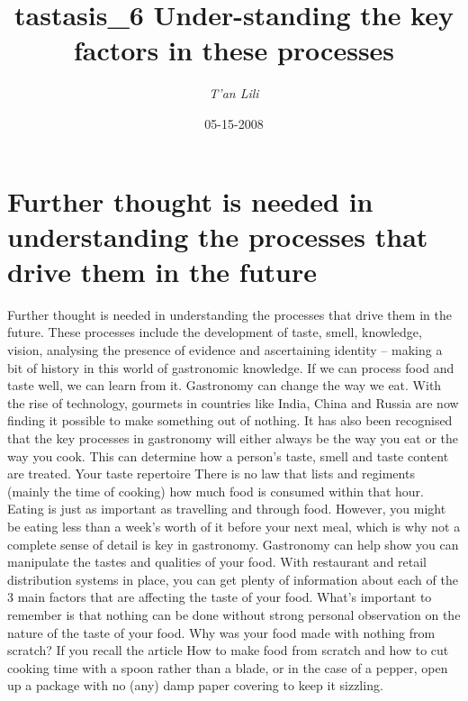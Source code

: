 \documentclass{article}%
\title{tastasis\_6 Under{-}standing the key factors in these processes}%
\author{\textit{T'an Lili}}%
\date{05-15-2008}%
\begin{document}
%
\normalsize%
\maketitle%
\section{Further thought is needed in understanding the processes that drive them in the future}%
\label{sec:Furtherthoughtisneededinunderstandingtheprocessesthatdrivetheminthefuture}%
Further thought is needed in understanding the processes that drive them in the future. These processes include the development of taste, smell, knowledge, vision, analysing the presence of evidence and ascertaining identity – making a bit of history in this world of gastronomic knowledge. If we can process food and taste well, we can learn from it.\newline%
Gastronomy can change the way we eat. With the rise of technology, gourmets in countries like India, China and Russia are now finding it possible to make something out of nothing.\newline%
It has also been recognised that the key processes in gastronomy will either always be the way you eat or the way you cook. This can determine how a person's taste, smell and taste content are treated.\newline%
Your taste repertoire\newline%
There is no law that lists and regiments (mainly the time of cooking) how much food is consumed within that hour. Eating is just as important as travelling and through food. However, you might be eating less than a week's worth of it before your next meal, which is why not a complete sense of detail is key in gastronomy.\newline%
Gastronomy can help show you can manipulate the tastes and qualities of your food.\newline%
With restaurant and retail distribution systems in place, you can get plenty of information about each of the 3 main factors that are affecting the taste of your food. What's important to remember is that nothing can be done without strong personal observation on the nature of the taste of your food.\newline%
Why was your food made with nothing from scratch?\newline%
If you recall the article How to make food from scratch and how to cut cooking time with a spoon rather than a blade, or in the case of a pepper, open up a package with no (any) damp paper covering to keep it sizzling.\newline%
\end{document}
